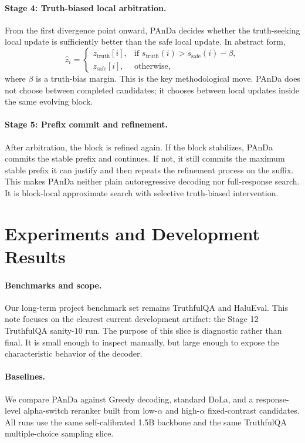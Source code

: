 \documentclass[10pt,twocolumn]{article}
\begin{document}
\paragraph{Stage 4: Truth-biased local arbitration.}
From the first divergence point onward, PAnDa decides whether the truth-seeking local update is sufficiently better than the safe local update. In abstract form,
\begin{equation}
\hat{z}_i =
\begin{cases}
z_{\text{truth}}[i], & \text{if } s_{\text{truth}}(i) > s_{\text{safe}}(i) - \beta, \\
z_{\text{safe}}[i], & \text{otherwise,}
\end{cases}
\end{equation}
where \(\beta\) is a truth-bias margin. This is the key methodological move. PAnDa does not choose between completed candidates; it chooses between local updates inside the same evolving block.

\paragraph{Stage 5: Prefix commit and refinement.}
After arbitration, the block is refined again. If the block stabilizes, PAnDa commits the stable prefix and continues. If not, it still commits the maximum stable prefix it can justify and then repeats the refinement process on the suffix. This makes PAnDa neither plain autoregressive decoding nor full-response search. It is block-local approximate search with selective truth-biased intervention.

\section{Experiments and Development Results}
\paragraph{Benchmarks and scope.}
Our long-term project benchmark set remains TruthfulQA and HaluEval. This note focuses on the clearest current development artifact: the Stage 12 TruthfulQA sanity-\(10\) run. The purpose of this slice is diagnostic rather than final. It is small enough to inspect manually, but large enough to expose the characteristic behavior of the decoder.

\paragraph{Baselines.}
We compare PAnDa against Greedy decoding, standard DoLa, and a response-level alpha-switch reranker built from low-\(\alpha\) and high-\(\alpha\) fixed-contrast candidates. All runs use the same self-calibrated 1.5B backbone and the same TruthfulQA multiple-choice sampling slice.
\end{document}
